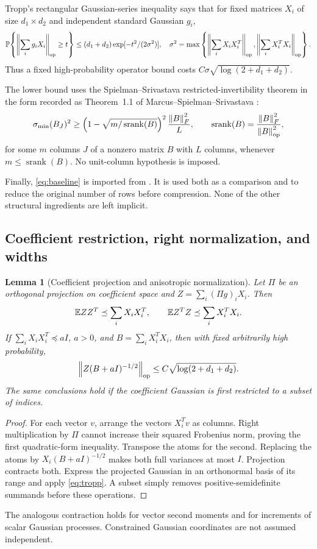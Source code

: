 \documentclass[11pt]{article}
\newtheorem{lemma}[theorem]{Lemma}
\theoremstyle{remark}\newtheorem{remark}[theorem]{Remark}
\newcommand{\norm}[1]{\left\|#1\right\|}\newcommand{\ip}[2]{\left\langle #1,#2\right\rangle}
\DeclareMathOperator{\srank}{srank}
\begin{document}
Tropp's rectangular Gaussian-series inequality \cite[Theorem~1.5]{tropp} says that for fixed matrices $X_i$ of size $d_1\times d_2$ and independent standard Gaussian $g_i$,
\begin{equation}\label{eq:tropp}
 \Prob\!\left\{\norm{\sum_i g_iX_i}_{\op}\ge t\right\}
 \le(d_1+d_2)\exp[-t^2/(2\sigma^2)],\quad
 \sigma^2=\max\left\{\norm{\sum_iX_iX_i^T}_{\op},\norm{\sum_iX_i^TX_i}_{\op}\right\}.
\end{equation}
Thus a fixed high-probability operator bound costs $C\sigma\sqrt{\log(2+d_1+d_2)}$.

The lower bound uses the Spielman--Srivastava restricted-invertibility theorem in the form recorded as Theorem~1.1 of Marcus--Spielman--Srivastava \cite{mss}:
\begin{equation}\label{eq:ri}
 \sigma_{\min}(B_J)^2\ge
 \left(1-\sqrt{m/\srank(B)}\right)^2\frac{\norm B_F^2}{L},
 \qquad \srank(B)=\frac{\norm B_F^2}{\norm B_{\op}^2},
\end{equation}
for some $m$ columns $J$ of a nonzero matrix $B$ with $L$ columns, whenever $m\le\srank(B)$. No unit-column hypothesis is imposed.

Finally, \eqref{eq:baseline} is imported from \cite{lmw}. It is used both as a comparison and to reduce the original number of rows before compression. None of the other structural ingredients are left implicit.

\subsection{Coefficient restriction, right normalization, and widths}
\begin{lemma}[Coefficient projection and anisotropic normalization]\label{lem:variance}
Let $\Pi$ be an orthogonal projection on coefficient space and $Z=\sum_i(\Pi g)_iX_i$. Then
\[
 \mathbb E ZZ^T\preceq\sum_iX_iX_i^T,\qquad \mathbb E Z^TZ\preceq\sum_iX_i^TX_i.
\]
If $\sum_iX_iX_i^T\preceq aI$, $a>0$, and $B=\sum_iX_i^TX_i$, then with fixed arbitrarily high probability,
\begin{equation}\label{eq:aniso}
 \norm{Z(B+aI)^{-1/2}}_{\op}\le C\sqrt{\log(2+d_1+d_2)}.
\end{equation}
The same conclusions hold if the coefficient Gaussian is first restricted to a subset of indices.
\end{lemma}
\begin{proof}
For each vector $v$, arrange the vectors $X_i^Tv$ as columns. Right multiplication by $\Pi$ cannot increase their squared Frobenius norm, proving the first quadratic-form inequality. Transpose the atoms for the second. Replacing the atoms by $X_i(B+aI)^{-1/2}$ makes both full variances at most $I$. Projection contracts both. Express the projected Gaussian in an orthonormal basis of its range and apply \eqref{eq:tropp}. A subset simply removes positive-semidefinite summands before these operations.
\end{proof}
The analogous contraction holds for vector second moments and for increments of scalar Gaussian processes. Constrained Gaussian coordinates are not assumed independent.
\end{document}
